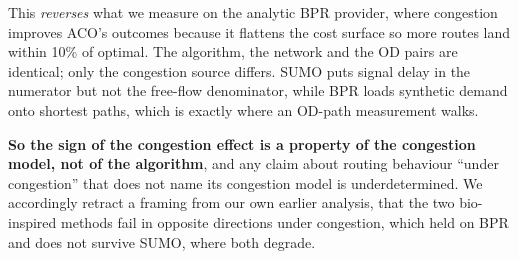 This \emph{reverses} what we measure on the analytic BPR provider, where
congestion improves ACO's outcomes because it flattens the cost surface so
more routes land within 10\% of optimal. The algorithm, the network and the
OD pairs are identical; only the congestion source differs. SUMO puts signal
delay in the numerator but not the free-flow denominator, while BPR loads
synthetic demand onto shortest paths, which is exactly where an OD-path
measurement walks.

\textbf{So the sign of the congestion effect is a property of the congestion
model, not of the algorithm}, and any claim about routing behaviour ``under
congestion'' that does not name its congestion model is underdetermined. We
accordingly retract a framing from our own earlier analysis, that the two
bio-inspired methods fail in opposite directions under congestion, which held
on BPR and does not survive SUMO, where both degrade.
